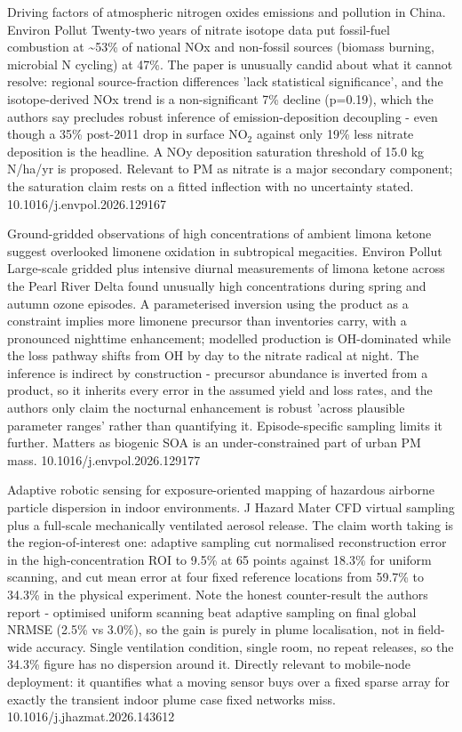 \documentclass[10pt]{article}
\begin{document}
{Driving factors of atmospheric nitrogen oxides emissions and pollution in China.}
{Environ Pollut}
{Twenty-two years of nitrate isotope data put fossil-fuel combustion at \textasciitilde{}53\% of national NOx and non-fossil sources (biomass burning, microbial N cycling) at 47\%. The paper is unusually candid about what it cannot resolve: regional source-fraction differences 'lack statistical significance', and the isotope-derived NOx trend is a non-significant 7\% decline (p=0.19), which the authors say precludes robust inference of emission-deposition decoupling - even though a 35\% post-2011 drop in surface NO$_2$ against only 19\% less nitrate deposition is the headline. A NOy deposition saturation threshold of 15.0 kg N/ha/yr is proposed. Relevant to PM as nitrate is a major secondary component; the saturation claim rests on a fitted inflection with no uncertainty stated.}
{10.1016/j.envpol.2026.129167}

{Ground-gridded observations of high concentrations of ambient limona ketone suggest overlooked limonene oxidation in subtropical megacities.}
{Environ Pollut}
{Large-scale gridded plus intensive diurnal measurements of limona ketone across the Pearl River Delta found unusually high concentrations during spring and autumn ozone episodes. A parameterised inversion using the product as a constraint implies more limonene precursor than inventories carry, with a pronounced nighttime enhancement; modelled production is OH-dominated while the loss pathway shifts from OH by day to the nitrate radical at night. The inference is indirect by construction - precursor abundance is inverted from a product, so it inherits every error in the assumed yield and loss rates, and the authors only claim the nocturnal enhancement is robust 'across plausible parameter ranges' rather than quantifying it. Episode-specific sampling limits it further. Matters as biogenic SOA is an under-constrained part of urban PM mass.}
{10.1016/j.envpol.2026.129177}


{Adaptive robotic sensing for exposure-oriented mapping of hazardous airborne particle dispersion in indoor environments.}
{J Hazard Mater}
{CFD virtual sampling plus a full-scale mechanically ventilated aerosol release. The claim worth taking is the region-of-interest one: adaptive sampling cut normalised reconstruction error in the high-concentration ROI to 9.5\% at 65 points against 18.3\% for uniform scanning, and cut mean error at four fixed reference locations from 59.7\% to 34.3\% in the physical experiment. Note the honest counter-result the authors report - optimised uniform scanning beat adaptive sampling on final global NRMSE (2.5\% vs 3.0\%), so the gain is purely in plume localisation, not in field-wide accuracy. Single ventilation condition, single room, no repeat releases, so the 34.3\% figure has no dispersion around it. Directly relevant to mobile-node deployment: it quantifies what a moving sensor buys over a fixed sparse array for exactly the transient indoor plume case fixed networks miss.}
{10.1016/j.jhazmat.2026.143612}
\end{document}

